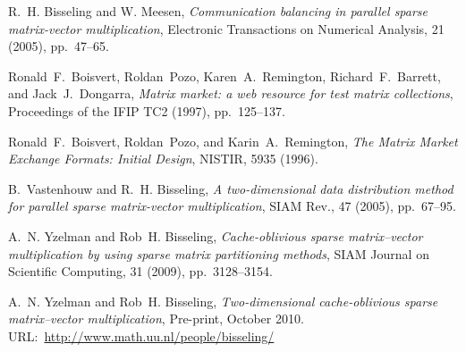 \documentclass[final]{amsart}
\begin{document}
\begin{thebibliography}{10}

{\sc R.~H. Bisseling and W. Meesen}, {\em Communication balancing in 
  parallel sparse matrix-vector multiplication},
  Electronic Transactions on Numerical Analysis, 21 (2005), pp.~47--65.

{\sc Ronald~F.~Boisvert, Roldan~Pozo, Karen~A.~Remington, Richard~F.~Barrett, and Jack~J.~Dongarra},
  {\em Matrix market: a web resource for test matrix collections},
  Proceedings of the IFIP TC2 (1997), pp.~125--137.

{\sc Ronald~F.~Boisvert, Roldan~Pozo, and Karin~A.~Remington},
  {\em The Matrix Market Exchange Formats: Initial Design},
  NISTIR, 5935 (1996).

{\sc B.~Vastenhouw and R.~H. Bisseling}, {\em A two-dimensional data
  distribution method for parallel sparse matrix-vector multiplication}, SIAM
  Rev., 47 (2005), pp.~67--95.

{\sc A.~N. Yzelman and Rob~H. Bisseling}, {\em Cache-oblivious sparse
  matrix--vector multiplication by using sparse matrix partitioning methods},
  SIAM Journal on Scientific Computing, 31 (2009), pp.~3128--3154.

{\sc A.~N. Yzelman and Rob~H. Bisseling}, {\em Two-dimensional cache-oblivious
  sparse matrix--vector multiplication}, Pre-print, October 2010.
  URL:~\url{http://www.math.uu.nl/people/bisseling/}

\end{thebibliography}

\clearpage
\end{document}
